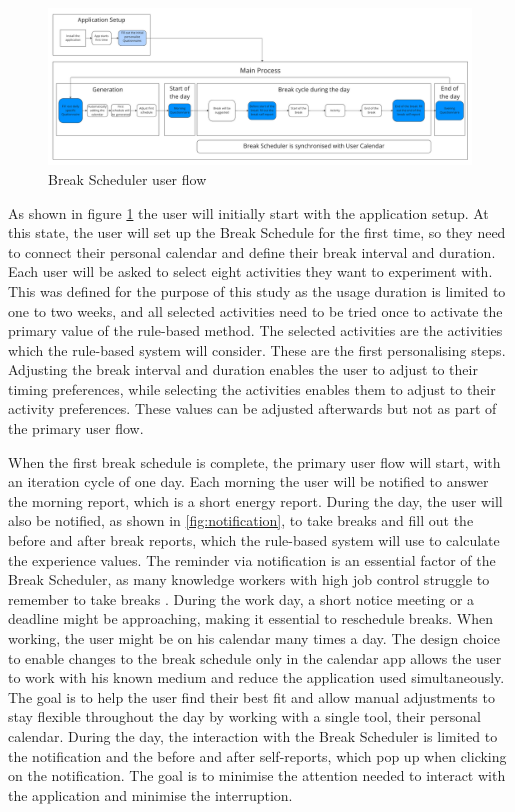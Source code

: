 \documentclass{hasel_thesis}
\begin{document}
\begin{figure}[htp]
    \centering
    \includegraphics[width=15cm]{hasel_thesis/images/userflow_v2.png}
    \caption{Break Scheduler user flow}
    \label{fig:user-flow}
\end{figure}

As shown in figure \ref{fig:user-flow} the user will initially start with the application setup. At this state, the user will set up the Break Schedule for the first time, so they need to connect their personal calendar and define their break interval and duration. Each user will be asked to select eight activities they want to experiment with. This was defined for the purpose of this study as the usage duration is limited to one to two weeks, and all selected activities need to be tried once to activate the primary value of the rule-based method. The selected activities are the activities which the rule-based system will consider. These are the first personalising steps. Adjusting the break interval and duration enables the user to adjust to their timing preferences, while selecting the activities enables them to adjust to their activity preferences. These values can be adjusted afterwards but not as part of the primary user flow. 


When the first break schedule is complete, the primary user flow will start, with an iteration cycle of one day. Each morning the user will be notified to answer the morning report, which is a short energy report. During the day, the user will also be notified, as shown in \ref{fig:notification}, to take breaks and fill out the before and after break reports, which the rule-based system will use to calculate the experience values. The reminder via notification is an essential factor of the Break Scheduler, as many knowledge workers with high job control struggle to remember to take breaks \cite{McLean.2001}. During the work day, a short notice meeting or a deadline might be approaching, making it essential to reschedule breaks. When working, the user might be on his calendar many times a day. The design choice to enable changes to the break schedule only in the calendar app allows the user to work with his known medium and reduce the application used simultaneously. The goal is to help the user find their best fit and allow manual adjustments to stay flexible throughout the day by working with a single tool, their personal calendar. During the day, the interaction with the Break Scheduler is limited to the notification and the before and after self-reports, which pop up when clicking on the notification. The goal is to minimise the attention needed to interact with the application and minimise the interruption. 
\end{document}
